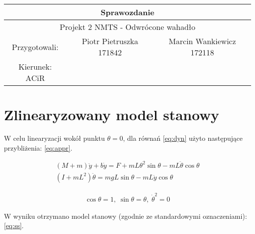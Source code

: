 \documentclass{article}
\begin{document}
\begin{tabular}{|c|c|c|}
\hline 
\multicolumn{3}{|c|}{\huge Sprawozdanie } \\ 
\hline 
\multicolumn{3}{|c|}{\LARGE Projekt 2 NMTS - Odwrócone wahadło} \\ 
\hline 
\Large Przygotowali: &\Large Piotr Pietruszka 171842 &\Large Marcin Wankiewicz 172118  \\ 
\hline 
\Large Kierunek: ACiR  \\ 
\hline 
 
\end{tabular} 

\section{Zlinearyzowany model stanowy}
W celu linearyzacji wokół punktu $\theta=0$, dla równań \ref{eq:dyn} użyto następujące przybliżenia: \ref{eq:appr}.

\begin{equation}\label{eq:dyn}
 \begin{array}{l}
  (M+m) \ddot{y} + b\dot{y} = F + mL\theta^2 \sin\theta - mL\ddot{\theta}\cos\theta \\
  (I + mL^2)\ddot{\theta} = mgL\sin\theta - mL\ddot{y}\cos\theta
 \end{array}
\end{equation}

\begin{equation}\label{eq:appr}
 \begin{array}{l}
  \cos\theta = 1,\;  \sin\theta=\theta, \; \dot{\theta}^2 = 0
 \end{array}
\end{equation}

W wyniku otrzymano model stanowy (zgodnie ze standardowymi oznaczeniami): \ref{eq:ss}.
\end{document}
